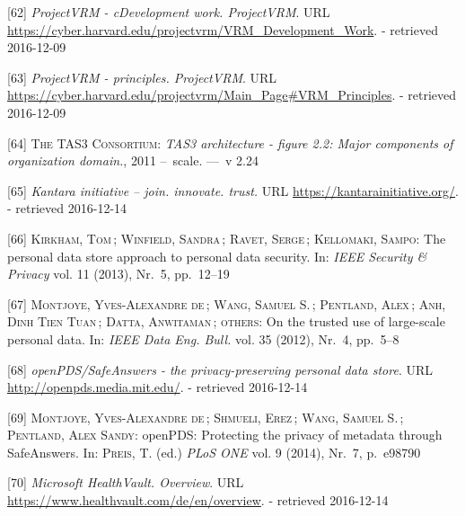 \documentclass[12pt,english,a4paper,titlepage,cleardoublepage=empty,dottedtoc]{report}
\begin{document}
\hypertarget{ref-web_2016_projectvrm_development-work}{}
{[}62{]} \emph{ProjectVRM - cDevelopment work. ProjectVRM}. URL
\url{https://cyber.harvard.edu/projectvrm/VRM_Development_Work}. -
retrieved 2016-12-09

\hypertarget{ref-web_2016_projectvrm_principles}{}
{[}63{]} \emph{ProjectVRM - principles. ProjectVRM}. URL
\url{https://cyber.harvard.edu/projectvrm/Main_Page\#VRM_Principles}. -
retrieved 2016-12-09

\hypertarget{ref-graphic_2011_architecture_components-of-organization-domain}{}
{[}64{]} \textsc{The TAS3 Consortium}: \emph{TAS3 architecture - figure
2.2: Major components of organization domain.}, 2011 --~scale. ---~v
2.24

\hypertarget{ref-web_kantara-initiative}{}
{[}65{]} \emph{Kantara initiative -- join. innovate. trust.} URL
\url{https://kantarainitiative.org/}. - retrieved 2016-12-14

\hypertarget{ref-paper_2014_personal-data-store-approach}{}
{[}66{]} \textsc{Kirkham, Tom}\,; \textsc{Winfield, Sandra}\,;
\textsc{Ravet, Serge}\,; \textsc{Kellomaki, Sampo}: The personal data
store approach to personal data security. In: \emph{IEEE Security \&
Privacy} vol. 11 (2013), Nr.~5, pp.~12--19

\hypertarget{ref-paper_2012_openpds_on-trusted-use-of-large-scale-personal-data}{}
{[}67{]} \textsc{Montjoye, Yves-Alexandre de}\,; \textsc{Wang, Samuel
S.}\,; \textsc{Pentland, Alex}\,; \textsc{Anh, Dinh Tien Tuan}\,;
\textsc{Datta, Anwitaman}\,; \textsc{others}: On the trusted use of
large-scale personal data. In: \emph{IEEE Data Eng. Bull.} vol. 35
(2012), Nr.~4, pp.~5--8

\hypertarget{ref-web_mit_openpds-safeanswers-project-page}{}
{[}68{]} \emph{openPDS/SafeAnswers - the privacy-preserving personal
data store}. URL \url{http://openpds.media.mit.edu/}. - retrieved
2016-12-14

\hypertarget{ref-paper_2014_openpds_protecting-privacy-of-meta-data-through-safeanswers}{}
{[}69{]} \textsc{Montjoye, Yves-Alexandre de}\,; \textsc{Shmueli,
Erez}\,; \textsc{Wang, Samuel S.}\,; \textsc{Pentland, Alex Sandy}:
openPDS: Protecting the privacy of metadata through SafeAnswers. In:
\textsc{Preis, T.} (ed.) \emph{PLoS ONE} vol. 9 (2014), Nr.~7, p.~e98790

\hypertarget{ref-web_microsoft_healthvault}{}
{[}70{]} \emph{Microsoft HealthVault. Overview}. URL
\url{https://www.healthvault.com/de/en/overview}. - retrieved 2016-12-14
\end{document}
